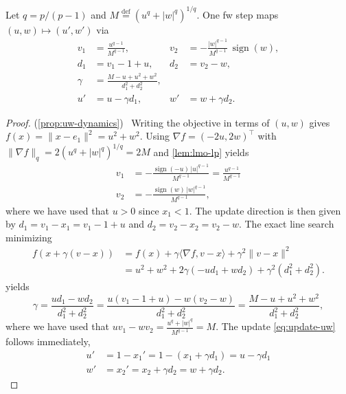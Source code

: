 \documentclass{article}
\DeclareMathOperator{\sign}{sign}
\newcommand{\norm}[1]{\|#1\|}
\newcommand{\ip}[1]{\langle #1 \rangle}
\newcommand{\defi}{\stackrel{\mathrm{\scriptscriptstyle def}}{=}}
\newcommand{\newtarget}[1]{\hypertarget{#1}{}}
\newcommand\linkofproof[1]{(\cref{#1})\newtarget{proof:#1}\ }
\begin{document}
\begin{proposition}\label{prop:uw-dynamics}
    Let $q=p/(p-1)$ and $M\defi (u^q+|w|^q)^{1/q}$.
    One \gls{fw} step maps $(u,w)\mapsto(u',w')$ via
    \begin{align}
        v_1 &= \frac{u^{q-1}}{M^{q-1}}, &
        v_2 &= -\frac{|w|^{q-1}}{M^{q-1}}\,\sign(w), \label{eq:lmo-uw} \\
        d_1 &= v_1-1+u, &
        d_2 &= v_2-w, \label{eq:dir-uw} \\
        \gamma &= \frac{M-u+u^2+w^2}{d_1^2+d_2^2}, \label{eq:gamma-uw} \\
        u' &= u-\gamma d_1, &
        w' &= w+\gamma d_2. \label{eq:update-uw}
    \end{align}
\end{proposition}
\begin{proof}\linkofproof{prop:uw-dynamics}
    Writing the objective in terms of $(u,w)$ gives $f(x) = \norm{x-e_1}^2 = u^2+w^2$.
    Using $\nabla f=(-2u,2w)^\top$ with $\norm{\nabla f}_q=2(u^q+|w|^q)^{1/q} = 2M$ and \cref{lem:lmo-lp} yields
    \begin{align*}
        v_1 &= -\frac{\sign(-u)\,|u|^{q-1}}{M^{q-1}} = \frac{u^{q-1}}{M^{q-1}}\\
        v_2 &= -\frac{\sign(w)\,|w|^{q-1}}{M^{q-1}},
    \end{align*}
    where we have used that $u > 0$ since $x_1 < 1$.
    The update direction is then given by $d_1 = v_1 - x_1 = v_1 -1+u$ and $d_2 = v_2 - x_2 = v_2 - w$.
    The exact line search minimizing
    \begin{align*}
        f(x+\gamma(v-x))
        &= f(x)+\gamma\ip{\nabla f, v-x}+\gamma^2\norm{v-x}^2 \\
        &= u^2+w^2+2\gamma(-ud_1+wd_2)+\gamma^2(d_1^2+d_2^2).
    \end{align*}
    yields
    \begin{equation}
        \label{eq:gamma-uw-expand}
        \gamma = \frac{ud_1-wd_2}{d_1^2+d_2^2} 
        = \frac{u(v_1-1+u) - w(v_2-w)}{d_1^2+d_2^2}
        = \frac{M-u+u^2+w^2}{d_1^2+d_2^2},
    \end{equation}
    where we have used that $uv_1-wv_2 = \frac{u^q+|w|^q}{M^{q-1}} = M$.
    The update \eqref{eq:update-uw} follows immediately,
    \begin{align*}
        u' &= 1 - x_1' = 1 -(x_1 + \gamma d_1) = u - \gamma d_1\\
        w' &= x_2' = x_2 + \gamma d_2 = w + \gamma d_2.
    \end{align*}
\end{proof}
\end{document}
